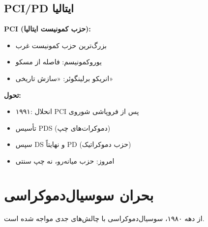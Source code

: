 \subsection{PCI/PD ایتالیا}

\begin{historybox}
\textbf{PCI (حزب کمونیست ایتالیا):}
\begin{itemize}[nosep]
    \item بزرگ‌ترین حزب کمونیست غرب
    \item یوروکمونیسم: فاصله از مسکو
    \item انریکو برلینگوئر: «سازش تاریخی»
\end{itemize}

\textbf{تحول:}
\begin{itemize}[nosep]
    \item ۱۹۹۱: انحلال PCI پس از فروپاشی شوروی
    \item تأسیس PDS (دموکرات‌های چپ)
    \item سپس DS و نهایتاً PD (حزب دموکراتیک)
    \item امروز: حزب میانه‌رو، نه چپ سنتی
\end{itemize}
\end{historybox}

\section{بحران سوسیال‌دموکراسی}

از دهه ۱۹۸۰، سوسیال‌دموکراسی با چالش‌های جدی مواجه شده است.

